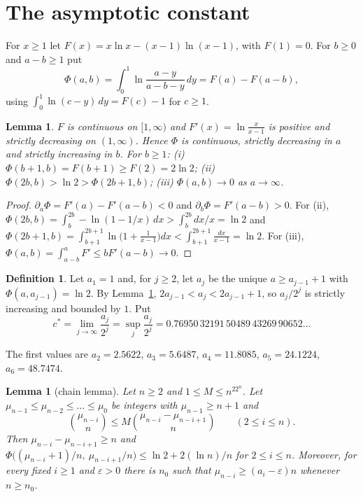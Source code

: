 \documentclass[11pt]{amsart}
\newtheorem{lemma}[theorem]{Lemma}
\theoremstyle{definition}
\newtheorem{definition}[theorem]{Definition}
\theoremstyle{remark}
\newcommand{\cs}{c^{*}}
\begin{document}
\section{The asymptotic constant}\label{sec:asym}

For $x\ge 1$ let $F(x)=x\ln x-(x-1)\ln(x-1)$, with $F(1)=0$. For $b\ge 0$ and $a-b\ge 1$ put
\[
  \Phi(a,b)=\int_0^1\ln\frac{a-y}{a-b-y}\,dy=F(a)-F(a-b),
\]
using $\int_0^1\ln(c-y)\,dy=F(c)-1$ for $c\ge 1$.

\begin{lemma}\label{lem:Phi}
$F$ is continuous on $[1,\infty)$ and $F'(x)=\ln\frac{x}{x-1}$ is positive and strictly decreasing on $(1,\infty)$. Hence $\Phi$ is
continuous, strictly decreasing in $a$ and strictly increasing in $b$. For $b\ge1$: (i) $\Phi(b+1,b)=F(b+1)\ge F(2)=2\ln 2$;
(ii) $\Phi(2b,b)>\ln 2>\Phi(2b+1,b)$; (iii) $\Phi(a,b)\to0$ as $a\to\infty$.
\end{lemma}

\begin{proof}
$\partial_a\Phi=F'(a)-F'(a-b)<0$ and $\partial_b\Phi=F'(a-b)>0$. For (ii),
$\Phi(2b,b)=\int_b^{2b}-\ln(1-1/x)\,dx>\int_b^{2b}dx/x=\ln2$ and
$\Phi(2b+1,b)=\int_{b+1}^{2b+1}\ln\bigl(1+\tfrac{1}{x-1}\bigr)dx<\int_{b+1}^{2b+1}\tfrac{dx}{x-1}=\ln 2$.
For (iii), $\Phi(a,b)=\int_{a-b}^aF'\le bF'(a-b)\to0$.
\end{proof}

\begin{definition}
Let $a_1=1$ and, for $j\ge2$, let $a_j$ be the unique $a\ge a_{j-1}+1$ with $\Phi(a,a_{j-1})=\ln 2$. By Lemma~\ref{lem:Phi},
$2a_{j-1}<a_j<2a_{j-1}+1$, so $a_j/2^j$ is strictly increasing and bounded by $1$. Put
\[
  \cs=\lim_{j\to\infty}\frac{a_j}{2^j}=\sup_j\frac{a_j}{2^j}=0.76950\,32191\,50489\,43269\,90652\ldots
\]
\end{definition}

The first values are $a_2=2.5622$, $a_3=5.6487$, $a_4=11.8085$, $a_5=24.1224$, $a_6=48.7474$.

\begin{lemma}[chain lemma]\label{lem:chain}
Let $n\ge2$ and $1\le M\le n^22^n$. Let $\mu_{n-1}\le\mu_{n-2}\le\dots\le\mu_0$ be integers with $\mu_{n-1}\ge n+1$ and
\begin{equation}\label{eq:chainhyp}
  \binom{\mu_{n-i}}{n}\le M\binom{\mu_{n-i}-\mu_{n-i+1}}{n}\qquad(2\le i\le n).
\end{equation}
Then $\mu_{n-i}-\mu_{n-i+1}\ge n$ and $\Phi\bigl((\mu_{n-i}+1)/n,\ \mu_{n-i+1}/n\bigr)\le\ln2+2(\ln n)/n$ for $2\le i\le n$. Moreover, for
every fixed $i\ge1$ and $\varepsilon>0$ there is $n_0$ such that $\mu_{n-i}\ge(a_i-\varepsilon)n$ whenever $n\ge n_0$.
\end{lemma}
\end{document}
